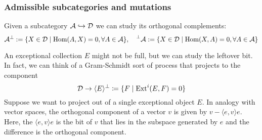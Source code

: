 



\subsubsection{Admissible subcategories and mutations}

Given a subcategory $\mathcal{A} \hookrightarrow \mathcal{D}$ we can study its orthogonal complements: $$\mathcal{A}^\perp : = \{ X \in \mathcal{D}\mid\operatorname{Hom}(A,X)=0, \forall A\in \mathcal{A}\}, \quad \prescript{\perp}{}{\mathcal{A}} : = \{ X \in \mathcal{D}\mid\operatorname{Hom}(X,A)=0, \forall A\in \mathcal{A}\}$$

An exceptional collection $E$ might not be full, but we can study the leftover bit. In fact, we can think of a Gram-Schmidt sort of process that projects to the component
\begin{equation*}
    \mathcal{D} \to \langle E\rangle^\perp \coloneqq \{F\mid\operatorname{Ext}^i(E,F)=0\}
\end{equation*}
Suppose we want to project out of a single exceptional object $E$. In analogy with vector spaces, the orthogonal component of a vector $v$ is given by $v-\langle e,v \rangle e$. Here, the $\langle e,v \rangle e$ is the bit of $v$ that lies in the subspace generated by $e$ and the difference is the orthogonal component.

